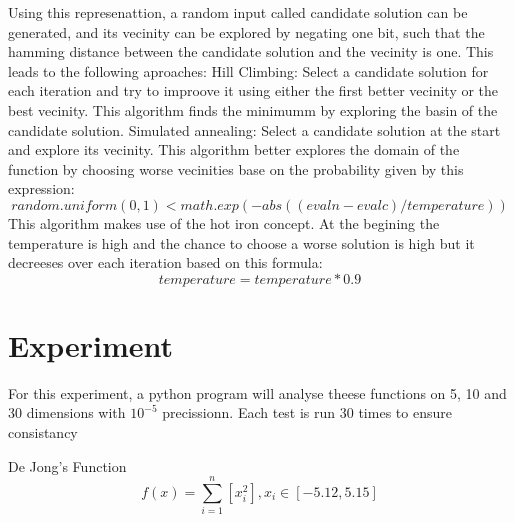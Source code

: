 \documentclass{article}
\begin{document}
Using this represenattion, a random input called candidate solution can be generated, and its vecinity can be explored by negating one bit, such that the hamming distance between the candidate solution and the vecinity is one. This leads to the following aproaches:
\newline
\newline
Hill Climbing:
\newline
\newline
Select a candidate solution for each iteration and try to improove it using either the first better vecinity or the best vecinity. This algorithm finds the minimumm by exploring the basin of the candidate solution.
\newline
\newline
Simulated annealing:
\newline
\newline
Select a candidate solution at the start and explore its vecinity. This algorithm better explores the domain of the function by choosing worse vecinities base on the probability given by this expression:
\newline
$$random.uniform(0, 1) < math.exp(-abs((evaln - evalc) / temperature))$$
\newline
This algorithm makes use of the hot iron concept. At the begining the temperature  is high and the chance to choose a worse solution is high but it decreeses over each iteration based on this formula:
\newline
$$temperature = temperature * 0.9$$
\newline
\newline
\newline
\newline
\newline
\newline

\section{Experiment}

For this experiment, a python program will analyse theese functions on 5, 10 and 30 dimensions with $10^{-5}$ precissionn. Each test is run 30 times to ensure consistancy

De Jong's Function
$$ f(x) = \sum_{i=1}^n \left[ x_i^2 \right],
 x_i \in \left[ -5.12, 5.15 \right]$$
\end{document}
